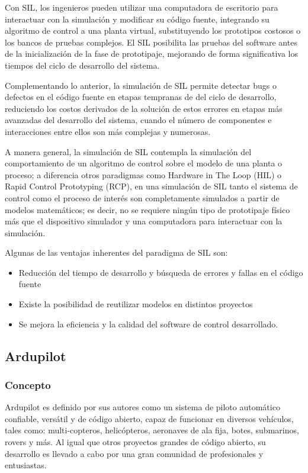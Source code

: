 Con SIL, los ingenieros pueden utilizar una computadora de escritorio para interactuar con la simulación y modificar su código fuente, integrando su algoritmo de control a una planta virtual, substituyendo los prototipos costosos o los bancos de pruebas complejos. El SIL posibilita las pruebas del software antes de la inicialización de la fase de prototipaje, mejorando de forma significativa los tiempos del ciclo de desarrollo del sistema. 

Complementando lo anterior, la simulación de SIL permite detectar bugs o defectos en el código fuente en etapas tempranas de del ciclo de desarrollo, reduciendo los costos derivados de la solución de estos errores en etapas más avanzadas del desarrollo del sistema, cuando el número de componentes e interacciones entre ellos son más complejas y numerosas. 

A manera general, la simulación de SIL contempla la simulación del comportamiento de un algoritmo de control sobre el modelo de una planta o proceso; a diferencia otros paradigmas como Hardware in The Loop (HIL) o Rapid Control Prototyping (RCP), en una simulación de SIL tanto el sistema de control como el proceso de interés son completamente simulados a partir de modelos matemáticos; es decir, no se requiere ningún tipo de prototipaje físico más que el dispositivo simulador y una computadora para interactuar con la simulación.


Algunas de las ventajas inherentes del paradigma de SIL son: 

\begin{itemize}
    \item Reducción del tiempo de desarrollo y búsqueda de errores y fallas en el código fuente 
    \item Existe la posibilidad de reutilizar modelos en distintos proyectos 
    \item Se mejora la eficiencia y la calidad del software de control desarrollado. 
\end{itemize}


\subsection{Ardupilot}

\subsubsection{Concepto}
Ardupilot es definido por sus autores \cite{ArduPilot} como un sistema de piloto automático confiable, versátil y de código abierto, capaz de funcionar en diversos vehículos, tales como: multi-copteros, helicópteros, aeronaves de ala fija, botes, submarinos, rovers y más. Al igual que otros proyectos grandes de código abierto, su desarrollo es llevado a cabo por una gran comunidad de profesionales y entusiastas.  

